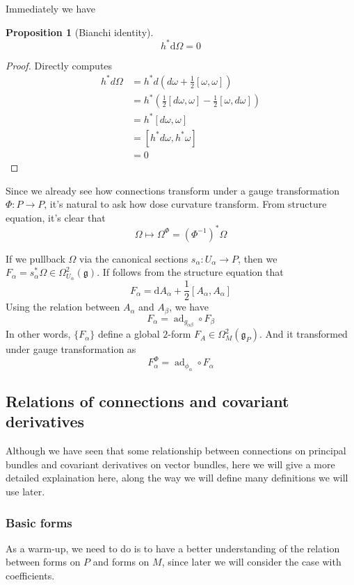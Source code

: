 \documentclass[11pt]{amsart}
\numberwithin{equation}{section}
\theoremstyle{plain}
\theoremstyle{plain}
\newtheorem{propsub}[thmsub]{Proposition}
\numberwithin{equation}{section}
\begin{document}
Immediately we have
\begin{propsub}[Bianchi identity]
$$
h^*\mathrm{d}\Omega=0
$$
\end{propsub}
\begin{proof}
Directly computes
$$
\begin{aligned}
h^{*} d \Omega &=h^{*} d\left(d \omega+\frac{1}{2}[\omega, \omega]\right) \\
&=h^{*}\left(\frac{1}{2}[d \omega, \omega]-\frac{1}{2}[\omega, d \omega]\right) \\
&=h^{*}[d \omega, \omega] \\
&=\left[h^{*} d \omega, h^{*} \omega\right] \\
&=0
\end{aligned}
$$
\end{proof}

Since we already see how connections transform under a gauge transformation $\Phi:P\to P$, it's natural to ask how dose curvature transform. From structure equation, it's clear that 
$$
\Omega\mapsto\Omega^{\Phi}=(\Phi^{-1})^*\Omega
$$

If we pullback $\Omega$ via the canonical sections $s_{\alpha}:U_{\alpha}\to P$, then we $F_{\alpha}=s^*_{\alpha}\Omega\in\Omega^2_{U_{\alpha}}(\mathfrak{g})$. If follows from the structure equation that 
$$
F_{\alpha}=\mathrm{d}A_{\alpha}+\frac12[A_{\alpha},A_{\alpha}]
$$
Using the relation between $A_{\alpha}$ and $A_{\beta}$, we have
$$
F_{\alpha}=\operatorname{ad}_{g_{\alpha\beta}}\circ F_{\beta}
$$
In other words, $\{F_{\alpha}\}$ define a global $2$-form $F_A\in\Omega_M^2(\mathfrak{g}_P)$. And it transformed under gauge transformation as
$$
F_{\alpha}^{\Phi}=\operatorname{ad}_{\phi_{\alpha}}\circ F_{\alpha}
$$


\subsection{Relations of connections and covariant derivatives}
Although we have seen that some relationship between connections on principal bundles and covariant derivatives on vector bundles, here we will give a more detailed explaination here, along the way we will define many definitions we will use later.

\subsubsection{Basic forms}
As a warm-up, we need to do is to have a better understanding of the relation between forms on $P$ and forms on $M$, since later we will consider the case with coefficients.
\end{document}
